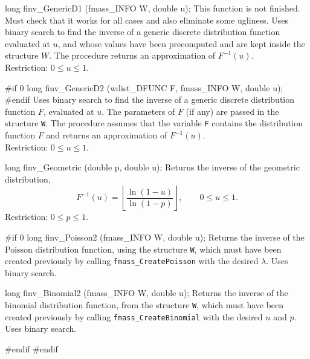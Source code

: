 long finv_GenericD1 (fmass_INFO W, double u);
\endcode
  \tab
This function is not finished. Must check that it works for all cases
and also eliminate some ugliness.
   Uses binary search to find the inverse of a generic discrete
   distribution function  evaluated at $u$, and whose values have been
   precomputed and are kept inside the structure $W$.
   The procedure  returns an approximation  of $F^{-1}(u)$. \\
   Restriction: $0 \le u \le 1$.
  \endtab
\code

#if 0
long finv_GenericD2 (wdist_DFUNC F, fmass_INFO W, double u);
#endif
\endcode
  \tab
   Uses binary search to find the inverse of a generic discrete
   distribution function $F$, evaluated at $u$.
   The parameters of $F$ (if any) are passed in the structure {\tt W}.
   The procedure assumes that the variable {\tt F}
   contains the distribution function $F$ and returns an approximation
   of $F^{-1}(u)$. \\
   Restriction: $0 \le u \le 1$.
  \endtab
\endhide
\code


long finv_Geometric (double p, double u);
\endcode
  \tab Returns the inverse of the geometric distribution,
$$
   F^{-1}(u) = \left\lfloor \frac{\ln (1 - u)}{\ln (1 - p)}\right\rfloor,
               \qquad  0 \le u \le 1.
$$
  Restriction: $0 \le p \le 1$.
 \endtab
\code

\hide
#if 0
long finv_Poisson2 (fmass_INFO W, double u);
\endcode
 \tab  Returns the inverse of the Poisson distribution function,
  using the structure {\tt W}, which must have been created previously
  by calling {\tt fmass\_CreatePoisson} with the desired $\lambda$.
  Uses binary search.
 \endtab
\code


long finv_Binomial2 (fmass_INFO W, double u);
\endcode
 \tab  Returns the inverse of the binomial distribution function,
  from the structure {\tt W}, which must have been created previously
  by calling {\tt fmass\_CreateBinomial} with the desired $n$ and $p$.
  Uses binary search.
 \endtab
\code

#endif
#endif
\endhide
\endcode
